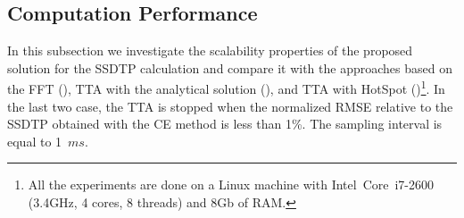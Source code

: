 \subsection{Computation Performance} \label{sec:results-ssdtp}
In this subsection we investigate the scalability properties of the proposed solution for the SSDTP calculation and compare it with the approaches based on the FFT (), TTA with the analytical solution (), and TTA with HotSpot ()\footnote{All the experiments are done on a Linux machine with Intel\textregistered\ Core\texttrademark\ i7-2600 (3.4GHz, 4 cores, 8 threads) and 8Gb of RAM.}. In the last two case, the TTA is stopped when the normalized RMSE relative to the SSDTP obtained with the CE method is less than 1\%. The sampling interval is equal to \mbox{1 $ms$}.

